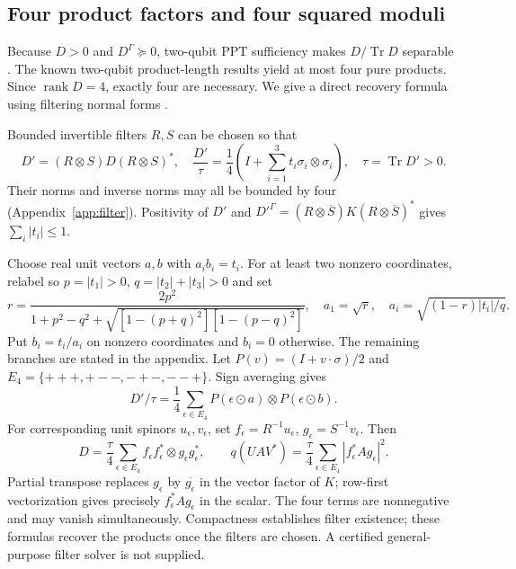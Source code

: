 \documentclass[11pt,a4paper]{article}
\theoremstyle{definition}\newtheorem{definition}[theorem]{Definition}
\theoremstyle{remark}\newtheorem{remark}[theorem]{Remark}
\DeclareMathOperator{\Tr}{Tr}\DeclareMathOperator{\rank}{rank}
\numberwithin{equation}{section}
\begin{document}
\subsection{Four product factors and four squared moduli}
Because $D>0$ and $D^\Gamma\succeq0$, two-qubit PPT sufficiency
makes $D/\Tr D$ separable \cite{peres,hhh96}.
The known two-qubit product-length results
\cite{sanpera,wootters} yield at most four pure products.
Since $\rank D=4$, exactly four are necessary.
We give a direct recovery formula using filtering normal forms
\cite{verstraete01,verstraete03}.

Bounded invertible filters $R,S$ can be chosen so that
\begin{equation}
D'=(R\otimes S)D(R\otimes S)^*,\quad
\frac{D'}{\tau}=\frac14\left(I+\sum_{i=1}^3t_i\sigma_i\otimes\sigma_i\right),
\quad \tau=\Tr D'>0.
\label{eq:normal}
\end{equation}
Their norms and inverse norms may all be bounded by four
(Appendix~\ref{app:filter}). Positivity of $D'$ and
$D'^\Gamma=(R\otimes\overline S)K(R\otimes\overline S)^*$
gives $\sum_i|t_i|\le1$.

Choose real unit vectors $a,b$ with $a_ib_i=t_i$.
For at least two nonzero coordinates, relabel so
$p=|t_1|>0$, $q=|t_2|+|t_3|>0$ and set
\begin{equation}
r=\frac{2p^2}
 {1+p^2-q^2+\sqrt{[1-(p+q)^2][1-(p-q)^2]}},\quad
a_1=\sqrt r,\quad a_i=\sqrt{(1-r)|t_i|/q}.
\label{eq:bloch}
\end{equation}
Put $b_i=t_i/a_i$ on nonzero coordinates and $b_i=0$ otherwise.
The remaining branches are stated in the appendix.
Let $P(v)=(I+v\cdot\sigma)/2$ and
$E_4=\{+++,+--,-+-,--+\}$. Sign averaging gives
\[
D'/\tau=\frac14\sum_{\epsilon\in E_4}
P(\epsilon\odot a)\otimes P(\epsilon\odot b).
\]
For corresponding unit spinors $u_\epsilon,v_\epsilon$, set
$f_\epsilon=R^{-1}u_\epsilon$, $g_\epsilon=S^{-1}v_\epsilon$.
Then
\begin{equation}
D=\frac{\tau}{4}\sum_{\epsilon\in E_4}
 f_\epsilon f_\epsilon^*\otimes g_\epsilon g_\epsilon^*,
\qquad
q(UAV^*)=\frac{\tau}{4}\sum_{\epsilon\in E_4}
                 |f_\epsilon^*Ag_\epsilon|^2.
\label{eq:four}
\end{equation}
Partial transpose replaces $g_\epsilon$ by $\overline{g_\epsilon}$
in the vector factor of $K$; row-first vectorization gives precisely
$f_\epsilon^*Ag_\epsilon$ in the scalar.
The four terms are nonnegative and may vanish simultaneously.
Compactness establishes filter existence; these formulas recover
the products once the filters are chosen. A certified general-purpose
filter solver is not supplied.
\end{document}
